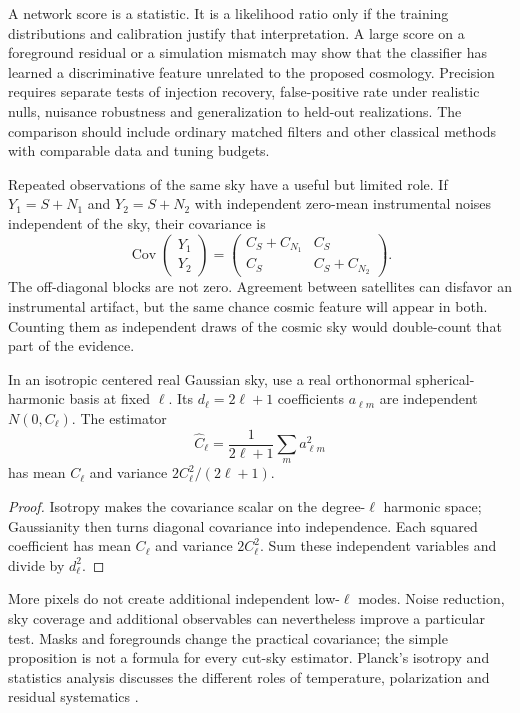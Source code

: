 A network score is a statistic. It is a likelihood ratio only if the
training distributions and calibration justify that interpretation. A
large score on a foreground residual or a simulation mismatch may show
that the classifier has learned a discriminative feature unrelated to
the proposed cosmology. Precision requires separate tests of injection
recovery, false-positive rate under realistic nulls, nuisance robustness
and generalization to held-out realizations. The comparison should
include ordinary matched filters and other classical methods with
comparable data and tuning budgets.

Repeated observations of the same sky have a useful but limited role.
If $Y_1=S+N_1$ and $Y_2=S+N_2$ with independent zero-mean instrumental
noises independent of the sky, their covariance is
\begin{equation}
 \operatorname{Cov}\begin{pmatrix}Y_1\\Y_2\end{pmatrix}
 =\begin{pmatrix}C_S+C_{N_1}&C_S\\C_S&C_S+C_{N_2}\end{pmatrix}.
 \label{eq:cc-samesky}
\end{equation}
The off-diagonal blocks are not zero. Agreement between satellites can
disfavor an instrumental artifact, but the same chance cosmic feature
will appear in both. Counting them as independent draws of the cosmic
sky would double-count that part of the evidence.

\begin{proposition}
\label{prop:cc-cosmicvariance}
In an isotropic centered real Gaussian sky, use a real orthonormal
spherical-harmonic basis at fixed $\ell$. Its $d_\ell=2\ell+1$
coefficients $a_{\ell m}$ are independent $N(0,C_\ell)$. The estimator
\[
 \widehat C_\ell=\frac1{2\ell+1}\sum_m a_{\ell m}^2
\]
has mean $C_\ell$ and variance $2C_\ell^2/(2\ell+1)$.
\end{proposition}

\begin{proof}
Isotropy makes the covariance scalar on the degree-$\ell$ harmonic
space; Gaussianity then turns diagonal covariance into independence.
Each squared coefficient has mean $C_\ell$ and variance $2C_\ell^2$.
Sum these independent variables and divide by $d_\ell^2$.
\end{proof}

More pixels do not create additional independent low-$\ell$ modes.
Noise reduction, sky coverage and additional observables can nevertheless
improve a particular test. Masks and foregrounds change the practical
covariance; the simple proposition is not a formula for every cut-sky
estimator. Planck's isotropy and statistics analysis discusses the
different roles of temperature, polarization and residual systematics
\citep[Secs.~1--2 and 8]{CCPlanck2020}.

